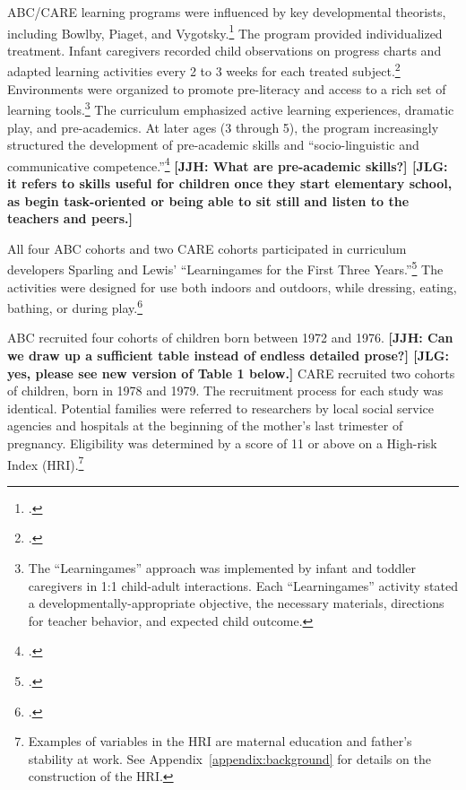 ABC/CARE learning programs were influenced by key developmental theorists, including Bowlby, Piaget, and Vygotsky.\footnote{\citet{Sparling_1974_Synth_Edu_Infant_SPEECH,Mcginness_1981_Developing,abc2014-2015interviews}.} The program provided individualized treatment. Infant caregivers recorded child observations on progress charts and adapted learning activities every 2 to 3 weeks for each treated subject.\footnote{\citet{Ramey_Collier_etal_1976_CarolinaAbecedarianProject,Campbell_Ramey_1994_CD}.} Environments were organized to promote pre-literacy and access to a rich set of learning tools.\footnote{The ``Learningames'' approach was implemented by infant and toddler caregivers in 1:1 child-adult interactions. Each ``Learningames'' activity stated a developmentally-appropriate objective, the necessary materials, directions for teacher behavior, and expected child outcome.} The curriculum emphasized active learning experiences, dramatic play, and pre-academics. At later ages (3 through 5), the program increasingly structured the development of pre-academic skills and ``socio-linguistic and communicative competence.''\footnote{\citet{Ramey-et-al_1977_Intro-to-ABC, Haskins_1985_CD, Ramey_1981_Modification, Ramey_Campbell_1979_SR, Ramey_Smith_1977_AJMD, Ramey_McGinness_etal_1982_Abecedarianapproach, Sparling_Lewis_1979_BOOKLearninggamesFirstThree,Sparling_Lewis_1984_BOOKLearningGamesThreesFours}.} \textbf{[JJH: What are pre-academic skills?] [JLG: it refers to skills useful for children once they start elementary school, as begin task-oriented or being able to sit still and listen to the teachers and peers.]}

All four ABC cohorts and two CARE cohorts participated in curriculum developers Sparling and Lewis' ``Learningames for the First Three Years.''\footnote{ \citet{Sparling_Lewis_1979_BOOKLearninggamesFirstThree}.} The activities were designed for use both indoors and outdoors, while dressing, eating, bathing, or during play.\footnote{\citet{Ramey_Campbell_1979_SR, Ramey_1981_Modification,Sparling_Lewis_1979_BOOKLearninggamesFirstThree}.}

ABC recruited four cohorts of children born between 1972 and 1976. \textbf{[JJH: Can we draw up a sufficient table instead of endless detailed prose?] [JLG: yes, please see new version of Table 1 below.]} CARE recruited two cohorts of children, born in 1978 and 1979. The recruitment process for each study was identical. Potential families were referred to researchers by local social service agencies and hospitals at the beginning of the mother's last trimester of pregnancy. Eligibility was determined by a score of 11 or above on a High-risk Index (HRI).\footnote{Examples of variables in the HRI are maternal education and father's stability at work. See Appendix~\ref{appendix:background} for details on the construction of the HRI.}

